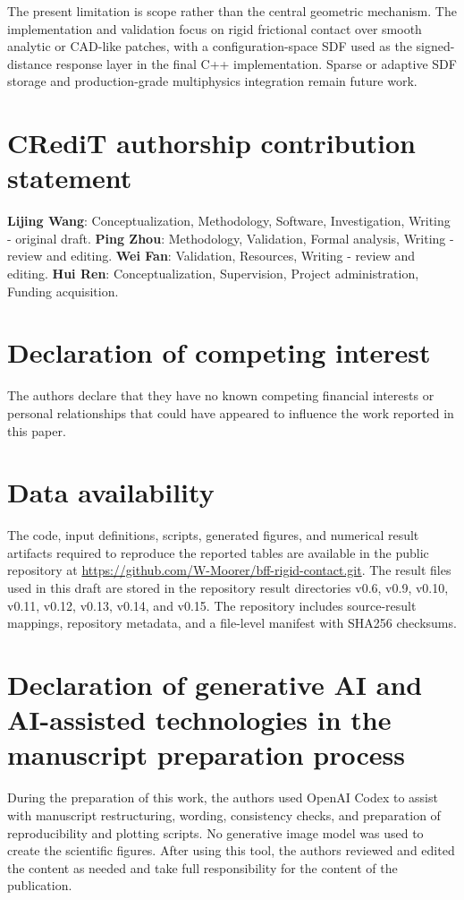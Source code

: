 \documentclass[preprint,12pt]{elsarticle}
\begin{document}
The present limitation is scope rather than the central geometric mechanism. The implementation and validation focus on rigid frictional contact over smooth analytic or CAD-like patches, with a configuration-space SDF used as the signed-distance response layer in the final C++ implementation. Sparse or adaptive SDF storage and production-grade multiphysics integration remain future work.

\section*{CRediT authorship contribution statement}
\textbf{Lijing Wang}: Conceptualization, Methodology, Software, Investigation, Writing - original draft.
\textbf{Ping Zhou}: Methodology, Validation, Formal analysis, Writing - review and editing.
\textbf{Wei Fan}: Validation, Resources, Writing - review and editing.
\textbf{Hui Ren}: Conceptualization, Supervision, Project administration, Funding acquisition.

\section*{Declaration of competing interest}
The authors declare that they have no known competing financial interests or personal relationships that could have appeared to influence the work reported in this paper.

\section*{Data availability}
The code, input definitions, scripts, generated figures, and numerical result artifacts required to reproduce the reported tables are available in the public repository at \url{https://github.com/W-Moorer/bff-rigid-contact.git}. The result files used in this draft are stored in the repository result directories v0.6, v0.9, v0.10, v0.11, v0.12, v0.13, v0.14, and v0.15. The repository includes source-result mappings, repository metadata, and a file-level manifest with SHA256 checksums.

\section*{Declaration of generative AI and AI-assisted technologies in the manuscript preparation process}
During the preparation of this work, the authors used OpenAI Codex to assist with manuscript restructuring, wording, consistency checks, and preparation of reproducibility and plotting scripts. No generative image model was used to create the scientific figures. After using this tool, the authors reviewed and edited the content as needed and take full responsibility for the content of the publication.
\end{document}
